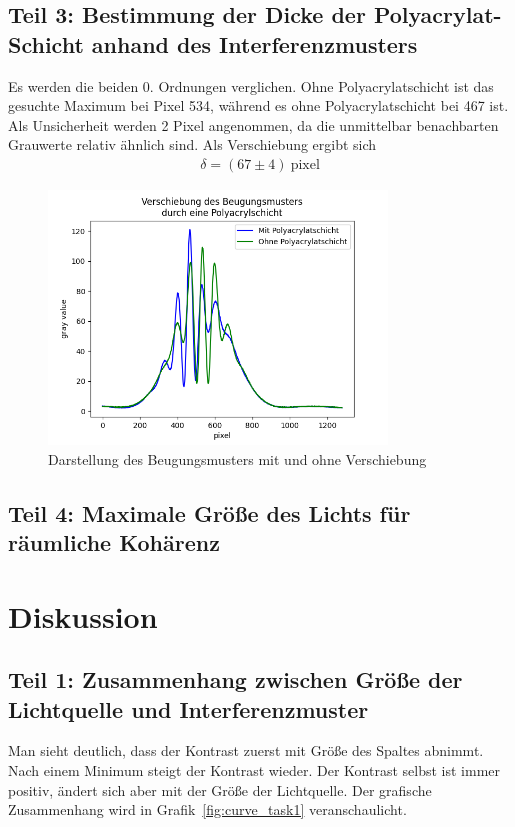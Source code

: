 \documentclass{article}
\begin{document}
\subsection{Teil 3: Bestimmung der Dicke der Polyacrylat-Schicht anhand des Interferenzmusters}

Es werden die beiden 0. Ordnungen verglichen. Ohne Polyacrylatschicht ist das gesuchte Maximum bei Pixel 534, während es ohne Polyacrylatschicht bei 467 ist. Als Unsicherheit werden 2 Pixel angenommen, da die unmittelbar benachbarten Grauwerte relativ ähnlich sind. Als Verschiebung ergibt sich
\begin{align*}
\delta = (67 \pm 4)~\text{pixel}
\end{align*}

\begin{figure}[H]
\centering
\caption{Darstellung des Beugungsmusters mit und ohne Verschiebung}
\includegraphics[width=9cm]{shift_noshift.png}
\end{figure}

\subsection{Teil 4: Maximale Größe des Lichts für räumliche Kohärenz}



\section{Diskussion}

\subsection{Teil 1: Zusammenhang zwischen Größe der Lichtquelle und Interferenzmuster}

Man sieht deutlich, dass der Kontrast zuerst mit Größe des Spaltes abnimmt. Nach einem Minimum steigt der Kontrast wieder. Der Kontrast selbst ist immer positiv, ändert sich aber mit der Größe der Lichtquelle. Der grafische Zusammenhang wird in Grafik~\ref{fig:curve_task1} veranschaulicht.
\end{document}
